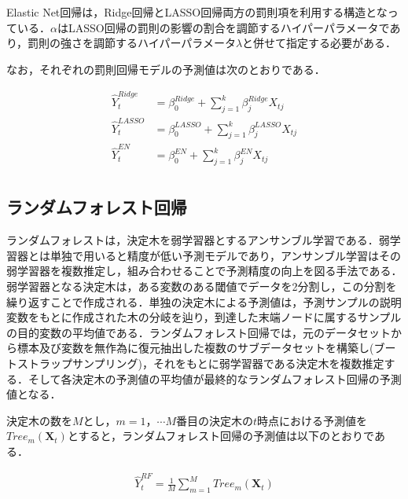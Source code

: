 \documentclass[a4paper，12pt]{jsarticle}
\begin{document}
Elastic Net回帰は，Ridge回帰とLASSO回帰両方の罰則項を利用する構造となっている．$\alpha$はLASSO回帰の罰則の影響の割合を調節するハイパーパラメータであり，罰則の強さを調節するハイパーパラメータ$\lambda$と併せて指定する必要がある．

なお，それぞれの罰則回帰モデルの予測値は次のとおりである．

\begin{equation}
  \begin{split}
    \hat{Y}_t^{Ridge} &= \beta_0^{Ridge} + \sum_{j=1}^{k} \beta_{j}^{Ridge} X_{tj} \\
    \hat{Y}_t^{LASSO} &= \beta_0^{LASSO} + \sum_{j=1}^{k} \beta_{j}^{LASSO} X_{tj} \\
    \hat{Y}_t^{EN} &= \beta_0^{EN} + \sum_{j=1}^{k} \beta_{j}^{EN} X_{tj} \\
  \end{split}
\end{equation}

\subsection{ランダムフォレスト回帰}

ランダムフォレスト\citep{breiman2001random}は，決定木を弱学習器とするアンサンブル学習である．弱学習器とは単独で用いると精度が低い予測モデルであり，アンサンブル学習はその弱学習器を複数推定し，組み合わせることで予測精度の向上を図る手法である．弱学習器となる決定木は，ある変数のある閾値でデータを2分割し，この分割を繰り返すことで作成される．単独の決定木による予測値は，予測サンプルの説明変数をもとに作成された木の分岐を辿り，到達した末端ノードに属するサンプルの目的変数の平均値である．ランダムフォレスト回帰では，元のデータセットから標本及び変数を無作為に復元抽出した複数のサブデータセットを構築し(ブートストラップサンプリング)，それをもとに弱学習器である決定木を複数推定する．そして各決定木の予測値の平均値が最終的なランダムフォレスト回帰の予測値となる．


決定木の数を$M$とし，$m=1，\cdots M$番目の決定木の$t$時点における予測値を$\textit{Tree}_m(\bm{X}_t)$とすると，ランダムフォレスト回帰の予測値は以下のとおりである．

\begin{equation}
  \begin{split}
    \hat{Y}_t^{RF} = \frac{1}{M} \sum_{m=1}^{M} \textit{Tree}_m(\bm{X}_t)
  \end{split}
\end{equation}
\end{document}
